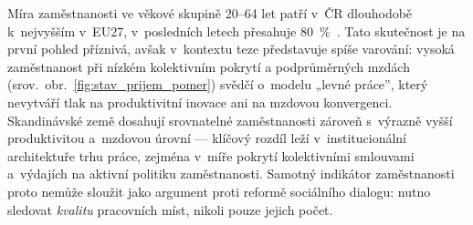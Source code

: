 Míra zaměstnanosti ve věkové skupině 20--64 let patří v~ČR dlouhodobě k~nejvyšším v~EU27, v~posledních letech přesahuje \SI{80}{\percent}~\cite{eurostat_lfsi_emp_a}.
Tato skutečnost je na první pohled příznivá, avšak v~kontextu teze představuje spíše varování: vysoká zaměstnanost při nízkém kolektivním pokrytí a podprůměrných mzdách (srov.~obr.~\ref{fig:stav_prijem_pomer}) svědčí o~modelu „levné práce”, který nevytváří tlak na produktivitní inovace ani na mzdovou konvergenci.
Skandinávské země dosahují srovnatelné zaměstnanosti zároveň s~výrazně vyšší produktivitou a~mzdovou úrovní --- klíčový rozdíl leží v~institucionální architektuře trhu práce, zejména v~míře pokrytí kolektivními smlouvami a~výdajích na aktivní politiku zaměstnanosti.
Samotný indikátor zaměstnanosti proto nemůže sloužit jako argument proti reformě sociálního dialogu: nutno sledovat \emph{kvalitu} pracovních míst, nikoli pouze jejich počet.



